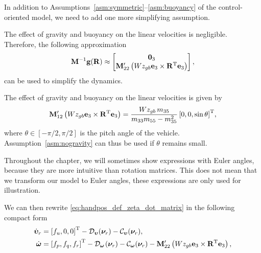 In addition to Assumptions~\ref{asm:symmetric}--\ref{asm:buoyancy} of the control-oriented model, we need to add one more simplifying assumption.
\begin{asm}
    \label{asm:nogravity}
    The effect of gravity and buoyancy on the linear velocities is negligible.
    Therefore, the following approximation
    \begin{equation}
        \mathbf{M}^{-1}\mathbf{g}(\mathbf{R}) \approx \begin{bmatrix}
            \mathbf{0}_3 \\ \mathbf{M}_{22}^{\prime} \left(Wz_{gb} \mathbf{e}_3 \times \mathbf{R}^{\mathrm{T}} \mathbf{e}_3\right)
        \end{bmatrix},
    \end{equation}
    can be used to simplify the dynamics.
\end{asm}
\begin{rmk*}
The effect of gravity and buoyancy on the linear velocities is given by
\begin{equation}
    \mathbf{M}_{12}^{\prime} \left(Wz_{gb} \mathbf{e}_3 \times \mathbf{R}^{\mathrm{T}} \mathbf{e}_3\right) = \frac{Wz_{gb}\,m_{35}}{m_{33}m_{55} - m_{35}^2}\left[0, 0, \sin\theta\right]^{\mathrm{T}}\!,
\end{equation}
where $\theta \in [-\pi/2, \pi/2]$ is the pitch angle of the vehicle.
Assumption~\ref{asm:nogravity} can thus be used if $\theta$ remains small.
\end{rmk*}
\begin{rmk*}
    Throughout the chapter, we will sometimes show expressions with Euler angles, because they are more intuitive than rotation matrices.
    This does not mean that we transform our model to Euler angles, these expressions are only used for illustration.
\end{rmk*}

\noindent We can then rewrite \eqref{eq:handpos_def_zeta_dot_matrix} in the following compact form \vspace*{-0.3em}
\begin{subequations}
    \begin{align}
        \dot{\bm{\upsilon}}_r &= \left[f_u, 0, 0\right]^{\mathrm{T}} - \mathcal{D}_{\bm{\upsilon}}(\bm{\nu}_r) - \mathcal{C}_{\bm{\upsilon}}(\bm{\nu}_r), \\
        \dot{\bm{\omega}} &= \left[f_p, f_q, f_r\right]^{\rm T} - \mathcal{D}_{\bm{\omega}}\hspace*{0.08em}(\bm{\nu}_r) - \mathcal{C}_{\bm{\omega}}(\bm{\nu}_r) - \mathbf{M}_{22}^{\prime}\left(Wz_{gb} \mathbf{e}_3 \times \mathbf{R}^{\mathrm{T}} \mathbf{e}_3\right),
    \end{align}
    \label{eq:handpos_def_ode_velocities}
\end{subequations}

